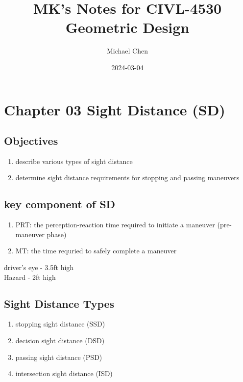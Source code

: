 \documentclass{article}
\title{MK's Notes for CIVL-4530 Geometric Design}
\date{2024-03-04}
\author{Michael Chen}
\begin{document}
  \setcounter{page}{30}   %


  \tableofcontents
  \newpage



  \setcounter{section}{2}
  \section{Chapter 03 Sight Distance (SD)}
  \subsection{Objectives}
  \begin{enumerate}
    \item describe various types of sight distance
    \item determine sight distance requirements for stopping and passing maneuvers
  \end{enumerate}

  \subsection{key component of SD}
  \begin{enumerate}
    \item PRT: the perception-reaction time required to initiate a maneuver (pre-maneuver phase)
    \item MT: the time requried to safely complete a maneuver
  \end{enumerate}
  driver's eye - 3.5ft high\\
  Hazard - 2ft high \\


  \subsection{Sight Distance Types}
  \begin{enumerate}
    \item stopping sight distance (SSD)
    \item decision sight distance (DSD)
    \item passing sight distance (PSD)
    \item intersection sight distance (ISD)
  \end{enumerate}
\end{document}
